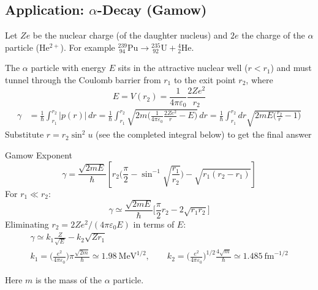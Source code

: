 \documentclass[11pt,a4paper]{article}
\begin{document}
\subsection{Application: \texorpdfstring{$\alpha$}{alpha}-Decay (Gamow)}
Let $Ze$ be the nuclear charge (of the daughter nucleus) and $2e$ the charge of the $\alpha$ particle (He$^{2+}$). For example $^{239}_{\ 94}\text{Pu}\to{}^{235}_{\ 92}\text{U}+{}^{4}_{2}\text{He}$.
\begin{center}
\end{center}
The $\alpha$ particle with energy $E$ sits in the attractive nuclear well ($r<r_1$) and must tunnel through the Coulomb barrier from $r_1$ to the exit point $r_2$, where
\[
E = V(r_2) = \frac1{4\pi\varepsilon_0}\frac{2Ze^2}{r_2}
\]
\begin{align*}
\gamma &= \frac1\hbar\int_{r_1}^{r_2}|p(r)|\,dr = \frac1\hbar\int_{r_1}^{r_2}\sqrt{2m\Big(\frac1{4\pi\varepsilon_0}\frac{2Ze^2}{r}-E\Big)}\,dr = \frac1\hbar\int_{r_1}^{r_2}dr\sqrt{2mE\Big(\frac{r_2}{r}-1\Big)}
\end{align*}
Substitute $r = r_2\sin^2u$ (see the completed integral below) to get the final answer
\begin{thm}{Gamow Exponent}
\[
\gamma = \frac{\sqrt{2mE}}{\hbar}\left[r_2\Big(\frac\pi2-\sin^{-1}\sqrt{\frac{r_1}{r_2}}\Big) - \sqrt{r_1(r_2-r_1)}\right]
\]
For $r_1\ll r_2$:
\[
\gamma\simeq\frac{\sqrt{2mE}}{\hbar}\Big[\frac\pi2r_2 - 2\sqrt{r_1r_2}\Big]
\]
Eliminating $r_2 = 2Ze^2/(4\pi\varepsilon_0E)$ in terms of $E$:
\begin{gather*}
\gamma\simeq k_1\frac{Z}{\sqrt E} - k_2\sqrt{Zr_1}\\
k_1 = \Big(\frac{e^2}{4\pi\varepsilon_0}\Big)\pi\frac{\sqrt{2m}}\hbar\simeq1.98\ \text{MeV}^{1/2},\qquad
k_2 = \Big(\frac{e^2}{4\pi\varepsilon_0}\Big)^{1/2}\frac{4\sqrt m}{\hbar}\simeq1.485\ \text{fm}^{-1/2}
\end{gather*}
\end{thm}
Here $m$ is the mass of the $\alpha$ particle.
\end{document}
